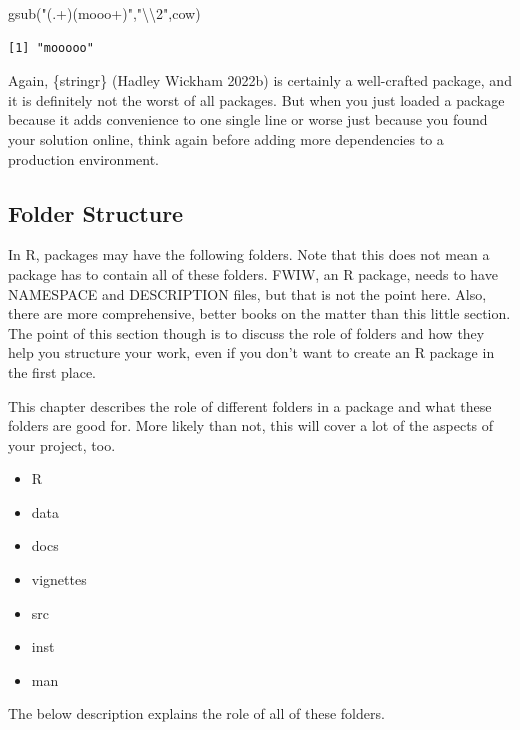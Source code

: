 \documentclass[
  12pt,
  letterpaper,
]{krantz}
\newenvironment{Shaded}{\begin{snugshade}}{\end{snugshade}}
\newcommand{\FunctionTok}[1]{\textcolor[rgb]{0.28,0.35,0.67}{#1}}
\newcommand{\NormalTok}[1]{\textcolor[rgb]{0.00,0.23,0.31}{#1}}
\newcommand{\SpecialCharTok}[1]{\textcolor[rgb]{0.37,0.37,0.37}{#1}}
\newcommand{\StringTok}[1]{\textcolor[rgb]{0.13,0.47,0.30}{#1}}
\providecommand{\tightlist}{%
  \setlength{\itemsep}{0pt}\setlength{\parskip}{0pt}}\usepackage{longtable,booktabs,array}
\begin{document}
\begin{Shaded}
\begin{Highlighting}[]
\FunctionTok{gsub}\NormalTok{(}\StringTok{"(.+)(mooo+)"}\NormalTok{,}\StringTok{"}\SpecialCharTok{\textbackslash{}\textbackslash{}}\StringTok{2"}\NormalTok{,cow)}
\end{Highlighting}
\end{Shaded}

\begin{verbatim}
[1] "mooooo"
\end{verbatim}

Again, \{stringr\} (Hadley Wickham 2022b) is certainly a well-crafted
package, and it is definitely not the worst of all packages. But when
you just loaded a package because it adds convenience to one single line
or worse just because you found your solution online, think again before
adding more dependencies to a production environment.

\hypertarget{folder-structure}{%
\subsection{Folder Structure}\label{folder-structure}}

In R, packages may have the following folders. Note that this does not
mean a package has to contain all of these folders. FWIW, an R package,
needs to have NAMESPACE and DESCRIPTION files, but that is not the point
here. Also, there are more comprehensive, better books on the matter
than this little section. The point of this section though is to discuss
the role of folders and how they help you structure your work, even if
you don't want to create an R package in the first place.

This chapter describes the role of different folders in a package and
what these folders are good for. More likely than not, this will cover a
lot of the aspects of your project, too.

\begin{itemize}
\tightlist
\item
  R
\item
  data
\item
  docs
\item
  vignettes
\item
  src
\item
  inst
\item
  man
\end{itemize}

The below description explains the role of all of these folders.
\end{document}
